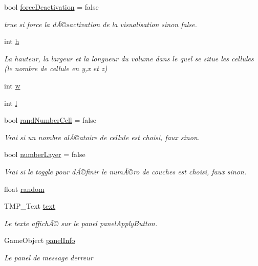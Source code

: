 \begin{DoxyCompactItemize}
bool \mbox{\hyperlink{class_edit_mode_manager_a2b9b6468cc837ee97b01202de2972129}{force\+Deactivation}} = false
\begin{DoxyCompactList}\small\item\em true si force la dÃ©sactivation de la visualisation sinon false. \end{DoxyCompactList}\item 
int \mbox{\hyperlink{class_edit_mode_manager_ad0e09cececc48bcb4e7b768fa35dc954}{h}}
\begin{DoxyCompactList}\small\item\em La hauteur, la largeur et la longueur du volume dans le quel se situe les cellules (le nombre de cellule en y,x et z) \end{DoxyCompactList}\item 
int \mbox{\hyperlink{class_edit_mode_manager_ad9e4950cf24abf3ede8c0891c4df7b77}{w}}
\item 
int \mbox{\hyperlink{class_edit_mode_manager_a1979d9d74b3ead0806d3aa58f92a298c}{l}}
\item 
bool \mbox{\hyperlink{class_edit_mode_manager_a82186201a56d05f092efab0e79f2a78d}{rand\+Number\+Cell}} = false
\begin{DoxyCompactList}\small\item\em Vrai si un nombre alÃ©atoire de cellule est choisi, faux sinon. \end{DoxyCompactList}\item 
bool \mbox{\hyperlink{class_edit_mode_manager_a0730066800d9fdb8d8872243bb0574ba}{number\+Layer}} = false
\begin{DoxyCompactList}\small\item\em Vrai si le toggle pour dÃ©finir le numÃ©ro de couches est choisi, faux sinon. \end{DoxyCompactList}\item 
float \mbox{\hyperlink{class_edit_mode_manager_ad5ab7a25d17a19fee7eda1becfddb719}{random}}
\item 
T\+M\+P\+\_\+\+Text \mbox{\hyperlink{class_edit_mode_manager_ae6fc2f251b5813fc0c75330462b9dade}{text}}
\begin{DoxyCompactList}\small\item\em Le texte affichÃ© sur le panel panel\+Apply\+Button. \end{DoxyCompactList}\item 
Game\+Object \mbox{\hyperlink{class_edit_mode_manager_a219384b34d903ef7872d37db677d5842}{panel\+Info}}
\begin{DoxyCompactList}\small\item\em Le panel de message d\textquotesingle{}erreur \end{DoxyCompactList}\item 

\end{DoxyCompactItemize}
